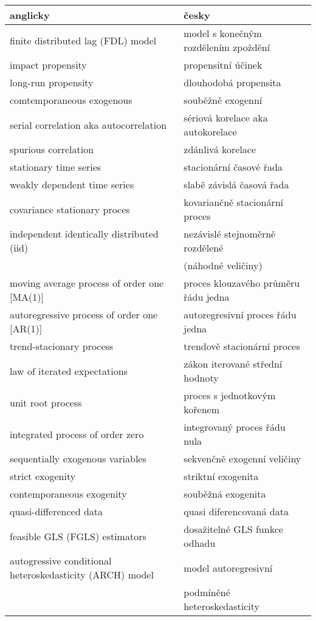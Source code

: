 \begin{table}
\begin{center}
\begin{tabular}{l l} 
\bf{anglicky} & \bf{česky}\\
\hline
finite distributed lag (FDL) model & model s konečným rozdělením zpoždění\\
impact propensity & propensitní účinek\\
long-run propensity & dlouhodobá propensita\\
comtemporaneous exogenous & souběžně exogenní\\
serial correlation aka autocorrelation & sériová korelace aka autokorelace\\
spurious correlation & zdánlivá korelace\\
stationary time series & stacionární časové řada\\
weakly dependent time series & slabě závislá časová řada\\
covariance stationary proces & kovariančně stacionární proces\\
independent identically distributed (iid) & nezávislé stejnoměrně rozdělené\\
 & (náhodné veličiny)\\
moving average process of order one [MA(1)] & proces klouzavého průměru řádu jedna\\
autoregressive process of order one [AR(1)] & autoregresivní proces řádu jedna\\
trend-stacionary process & trendově stacionární proces\\
law of iterated expectations & zákon iterované střední hodnoty\\
unit root process & proces s jednotkovým kořenem\\
integrated process of order zero & integrovaný proces řádu nula\\
sequentially exogenous variables & sekvenčně exogenní veličiny\\
strict exogenity & striktní exogenita\\
contemporaneous exogenity & souběžná exogenita\\
quasi-differenced data & quasi diferencovaná data\\
feasible GLS (FGLS) estimators & dosažitelné GLS funkce odhadu\\
autogressive conditional heteroskedasticity (ARCH) model & model autoregresivní\\
 & podmíněné heteroskedasticity\\

\end{tabular}
\end{center}
\end{table}
